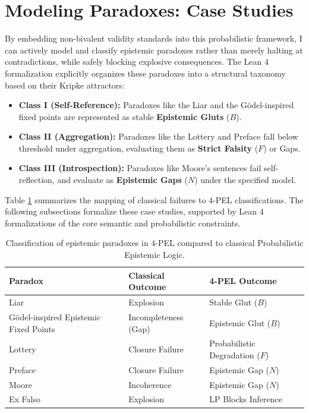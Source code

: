 \documentclass[11pt,a4paper]{article}
\begin{document}
\section{Modeling Paradoxes: Case Studies}
\label{sec:casestudies}

By embedding non-bivalent validity standards into this probabilistic framework, I can actively model and classify epistemic paradoxes rather than merely halting at contradictions, while safely blocking explosive consequences. The Lean 4 formalization explicitly organizes these paradoxes into a structural taxonomy based on their Kripke attractors:
\begin{itemize}
    \item \textbf{Class I (Self-Reference):} Paradoxes like the Liar and the G\"odel-inspired fixed points are represented as stable \textbf{Epistemic Gluts} ($B$).
    \item \textbf{Class II (Aggregation):} Paradoxes like the Lottery and Preface fall below threshold under aggregation, evaluating them as \textbf{Strict Falsity} ($F$) or Gaps.
    \item \textbf{Class III (Introspection):} Paradoxes like Moore's sentences fail self-reflection, and evaluate as \textbf{Epistemic Gaps} ($N$) under the specified model.
\end{itemize}

Table \ref{tab:paradox_resolution} summarizes the mapping of classical failures to 4-PEL classifications. The following subsections formalize these case studies, supported by Lean 4 formalizations of the core semantic and probabilistic constraints.

\begin{table}[ht]
\centering
\begin{tabular}{lll}
\hline
\textbf{Paradox} & \textbf{Classical Outcome} & \textbf{4-PEL Outcome} \\
\hline
Liar & Explosion & Stable Glut ($B$) \\
G\"odel-inspired Epistemic Fixed Points & Incompleteness (Gap) & Epistemic Glut ($B$) \\
Lottery & Closure Failure & Probabilistic Degradation ($F$) \\
Preface & Closure Failure & Epistemic Gap ($N$) \\
Moore & Incoherence & Epistemic Gap ($N$) \\
Ex Falso & Explosion & LP Blocks Inference \\
\hline
\end{tabular}
\caption{Classification of epistemic paradoxes in 4-PEL compared to classical Probabilistic Epistemic Logic.}
\label{tab:paradox_resolution}
\end{table}
\end{document}
